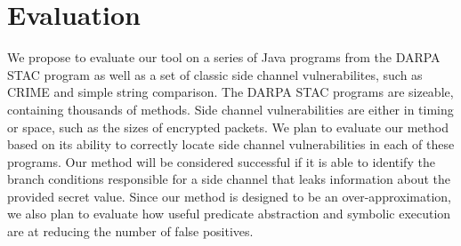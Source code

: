 \section{Evaluation}

We propose to evaluate our tool on a series of Java programs from the DARPA STAC program as well as a set of classic side channel vulnerabilites, such as CRIME \cite{crime} and simple string comparison. The DARPA STAC programs are sizeable, containing thousands of methods. Side channel vulnerabilities are either in timing or space, such as the sizes of encrypted packets. We plan to evaluate our method based on its ability to correctly locate side channel vulnerabilities in each of these programs. Our method will be considered successful if it is able to identify the branch conditions responsible for a side channel that leaks information about the provided secret value. Since our method is designed to be an over-approximation, we also plan to evaluate how useful predicate abstraction and symbolic execution are at reducing the number of false positives. 

